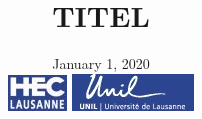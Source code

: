 \documentclass[a4paper, 12pt, oneside]{Thesis}
\begin{document}
\frontmatter	  %

\title  {TITEL}
\addresses  {\groupname\\\univname}  %
\date       {January 1, 2020\\
\vspace*{3cm}
\includegraphics[trim= 0.1cm 0cm 0cm 0cm,clip,scale=1 ]{logoHEC.jpg}
\hfill
\includegraphics[trim= 0.1cm 0cm 0cm 0cm,clip,scale=1 ]{logoUNIL.jpg}
}


\maketitle


\fancyhead{}  %
\rhead{\thepage}  %
\lhead{}  %

\pagestyle{fancy}  %
\end{document}
